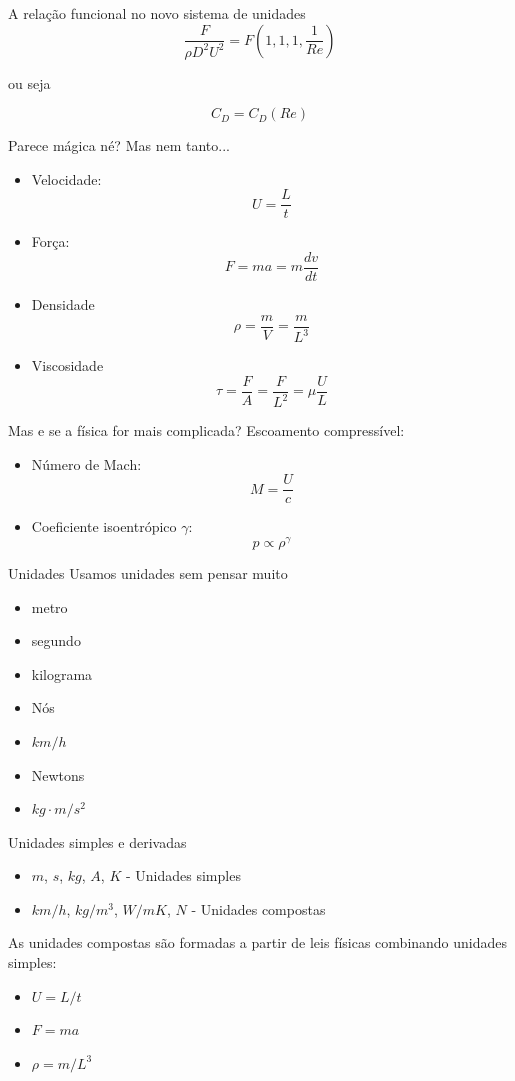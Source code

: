 \documentclass{beamer}
\begin{document}
\begin{frame}{A relação funcional no novo sistema de unidades}
  \[
\frac{F}{\rho D^2 U^2} = F\left(1,1,1, \frac{1}{Re} \right)
\]

ou seja

\[
C_D = C_D(Re)
\]



\end{frame}

\begin{frame}{Parece mágica né?}
  Mas nem tanto...
  \begin{itemize}
  \item Velocidade: \[U = \frac{L}{t}\]
  \item Força: \[F = ma = m\frac{dv}{dt}\]
  \item Densidade \[\rho = \frac{m}{V} = \frac{m}{L^3}\]
  \item Viscosidade \[\tau = \frac{F}{A} = \frac{F}{L^2} = \mu \frac{U}{L}\]
\end{itemize}

\end{frame}

\begin{frame}{Mas e se a física for mais complicada?}
  Escoamento compressível:
  \begin{itemize}
  \item Número de Mach: \[ M = \frac{U}{c} \]
  \item Coeficiente isoentrópico $\gamma$: \[ p \propto \rho^\gamma \]
  \end{itemize}
\end{frame}


\begin{frame}{Unidades}
  Usamos unidades sem pensar muito
  \begin{itemize}
  \item metro
  \item segundo
  \item kilograma
  \item Nós
  \item $km/h$
  \item Newtons
  \item $kg\cdot m /s^2$
\end{itemize}
\end{frame}

\begin{frame}{Unidades simples e derivadas}
\begin{itemize}
\item $m$, $s$, $kg$, $A$, $K$ - Unidades simples
\item $km/h$, $kg/m^3$, $W/mK$, $N$ - Unidades compostas
\end{itemize}

As unidades compostas são formadas a partir de leis físicas combinando
unidades simples:
\begin{itemize}
\item $U = L/t$
\item $F=ma$
\item $\rho = m/L^3$
\end{itemize}

\end{frame}
\end{document}
